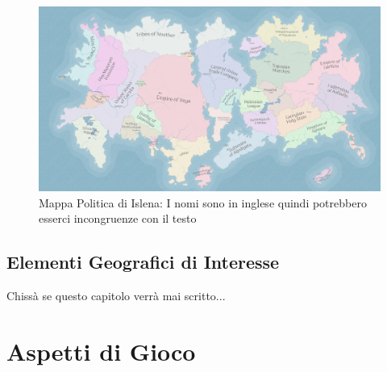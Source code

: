 \documentclass[10pt, a4paper]{report}
\newcommand{\partimagefile}{}
\newcommand{\partimage}[1]{%
	\renewcommand{\partimagefile}{#1}%
}
\begin{document}
\begin{figure}[h!]
	\includegraphics[width=\textwidth]{islena_politica.jpeg}
	\caption{Mappa Politica di Islena: I nomi sono in inglese quindi potrebbero esserci incongruenze con il testo}
\end{figure}


\chapter{Elementi Geografici di Interesse}
Chissà se questo capitolo verrà mai scritto...

\partimage{giocopart.png}
\part{Aspetti di Gioco}
\end{document}
